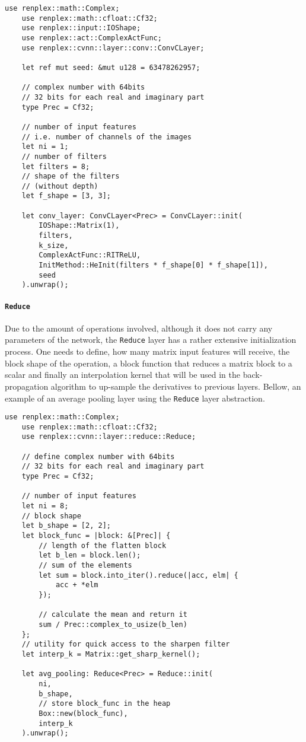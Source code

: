 \begin{lstlisting}[caption=Initialization of a complex convolutional layer.]
	use renplex::math::Complex;
	use renplex::math::cfloat::Cf32;
	use renplex::input::IOShape;
	use renplex::act::ComplexActFunc;
	use renplex::cvnn::layer::conv::ConvCLayer;
	
	let ref mut seed: &mut u128 = 63478262957;
	
	// complex number with 64bits
	// 32 bits for each real and imaginary part
	type Prec = Cf32;
	
	// number of input features
	// i.e. number of channels of the images
	let ni = 1;
	// number of filters
	let filters = 8;
	// shape of the filters
	// (without depth)
	let f_shape = [3, 3];
	
	let conv_layer: ConvCLayer<Prec> = ConvCLayer::init(
		IOShape::Matrix(1),
		filters,
		k_size,
		ComplexActFunc::RITReLU, 
		InitMethod::HeInit(filters * f_shape[0] * f_shape[1]),
		seed
	).unwrap();
\end{lstlisting}


\paragraph{\texttt{Reduce}}

Due to the amount of operations involved, although it does not carry any parameters of the network, the \texttt{Reduce} layer has a rather extensive initialization process. One needs to define, how many matrix input features will receive, the block shape of the operation, a block function that reduces a matrix block to a scalar and finally an interpolation kernel that will be used in the back-propagation algorithm to up-sample the derivatives to previous layers. Bellow, an example of an average pooling layer using the \texttt{Reduce} layer abstraction.

\begin{lstlisting}[caption=Initialization of a Mean Pooling layer using the Reduce layer generalization.]
	use renplex::math::Complex;
	use renplex::math::cfloat::Cf32;
	use renplex::cvnn::layer::reduce::Reduce;
	
	// define complex number with 64bits
	// 32 bits for each real and imaginary part
	type Prec = Cf32;
	
	// number of input features
	let ni = 8;
	// block shape
	let b_shape = [2, 2];
	let block_func = |block: &[Prec]| {
		// length of the flatten block
		let b_len = block.len(); 
		// sum of the elements
		let sum = block.into_iter().reduce(|acc, elm| {
			acc + *elm
		});
		
		// calculate the mean and return it
		sum / Prec::complex_to_usize(b_len)
	};
	// utility for quick access to the sharpen filter
	let interp_k = Matrix::get_sharp_kernel();
	
	let avg_pooling: Reduce<Prec> = Reduce::init(
		ni, 
		b_shape,
		// store block_func in the heap
		Box::new(block_func),
		interp_k
	).unwrap();
\end{lstlisting}


